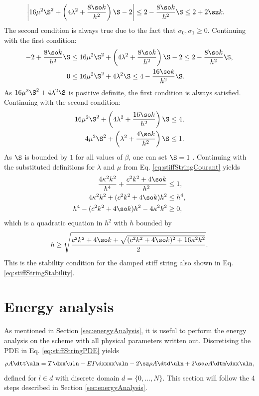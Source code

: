 {\begin{equation}
\begin{aligned}
        \left|16\mu^2\S^2+\left(4\lambda^2+\frac{8\so k}{h^2}\right)\S - 2\right|&\leq2-\frac{8\so k}{h^2}\S\leq2+2\sz k.
    \end{aligned}
\end{equation}
The second condition is always true due to the fact that $\sigma_0,\sigma_1 \geq 0$. Continuing with the first condition: 
\begin{align*}
    -2+\frac{8\so k}{h^2}\S&\leq 16\mu^2\S^2+\left(4\lambda^2+\frac{8\so k}{h^2}\right)\S - 2\leq 2-\frac{8\so k}{h^2}\S,\\
    0&\leq 16\mu^2\S^2+4\lambda^2\S\leq 4-\frac{16\so k}{h^2}\S.
\end{align*}
As $16\mu^2\S^2+4\lambda^2\S$ is positive definite, the first condition is always satisfied. Continuing with the second condition:
\begin{align*}
    16\mu^2\S^2+\left(4\lambda^2+ \frac{16\so k}{h^2}\right)\S &\leq 4,\\
    4\mu^2\S^2+\left(\lambda^2+ \frac{4\so k}{h^2}\right)\S&\leq 1.
\end{align*}
As $\S$ is bounded by $1$ for all values of $\beta$, one can set $\S = 1$ . Continuing with the substituted definitions for $\lambda$ and $\mu$ from Eq. \eqref{eq:stiffStringCourant} yields
\begin{align*}
    \frac{4\kappa^2k^2}{h^4}+\frac{c^2k^2 + 4\so k}{h^2}&\leq 1, \\
    4\kappa^2k^2+(c^2k^2+ 4\so k)h^2&\leq h^4,\\
    h^4- (c^2k^2+ 4\so k)h^2 - 4\kappa^2k^2 &\geq 0 ,
\end{align*}
which is a quadratic equation in $h^2$ with $h$ bounded by
\begin{equation}
    h \geq \sqrt{\frac{c^2k^2+4\so k + \sqrt{(c^2k^2 + 4\so k)^2+16\kappa^2k^2}}{2}}.
\end{equation}
This is the stability condition for the damped stiff string also shown in Eq. \eqref{eq:stiffStringStability}.

\section{Energy analysis}\label{sec:energyAnalysisString}
As mentioned in Section \ref{sec:energyAnalysis}, it is useful to perform the energy analysis on the scheme with all physical parameters written out. Discretising the PDE in Eq. \eqref{eq:stiffStringPDE} yields
\begin{equation}
    \rho A \dtt \uln = T \dxx \uln - EI \dxxxx \uln - 2\sz \rho A \dtd \uln + 2 \so \rho A \dtm \dxx \uln,
\end{equation}
defined for $l\in d$ with discrete domain $d = \{0, \hdots, N\}$. This section will follow the 4 steps described in Section \ref{sec:energyAnalysis}.

}
